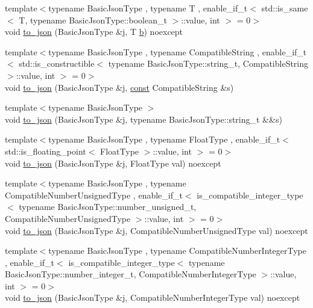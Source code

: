 \begin{DoxyCompactItemize}
\item 
{\footnotesize template$<$typename Basic\+Json\+Type , typename T , enable\+\_\+if\+\_\+t$<$ std\+::is\+\_\+same$<$ T, typename Basic\+Json\+Type\+::boolean\+\_\+t $>$\+::value, int $>$  = 0$>$ }\\void \hyperlink{namespacenlohmann_1_1detail_a1a804b98cbe89b7e44b698f2ca860490}{to\+\_\+json} (Basic\+Json\+Type \&j, T \hyperlink{jquery_8js_a2fa551895933fae935a0a6b87282241d}{b}) noexcept
\item 
{\footnotesize template$<$typename Basic\+Json\+Type , typename Compatible\+String , enable\+\_\+if\+\_\+t$<$ std\+::is\+\_\+constructible$<$ typename Basic\+Json\+Type\+::string\+\_\+t, Compatible\+String $>$\+::value, int $>$  = 0$>$ }\\void \hyperlink{namespacenlohmann_1_1detail_a7356ed05cdbbb080cee80e1211e1c6c9}{to\+\_\+json} (Basic\+Json\+Type \&j, \hyperlink{functions__c_8js_afacfd9c985d225bb07483b887a801b6f}{const} Compatible\+String \&s)
\item 
{\footnotesize template$<$typename Basic\+Json\+Type $>$ }\\void \hyperlink{namespacenlohmann_1_1detail_a4aa1ca6b7c61bf19d1f30ea5b669f68e}{to\+\_\+json} (Basic\+Json\+Type \&j, typename Basic\+Json\+Type\+::string\+\_\+t \&\&s)
\item 
{\footnotesize template$<$typename Basic\+Json\+Type , typename Float\+Type , enable\+\_\+if\+\_\+t$<$ std\+::is\+\_\+floating\+\_\+point$<$ Float\+Type $>$\+::value, int $>$  = 0$>$ }\\void \hyperlink{namespacenlohmann_1_1detail_a22bffdc8bc7e43af380ba2050696b230}{to\+\_\+json} (Basic\+Json\+Type \&j, Float\+Type val) noexcept
\item 
{\footnotesize template$<$typename Basic\+Json\+Type , typename Compatible\+Number\+Unsigned\+Type , enable\+\_\+if\+\_\+t$<$ is\+\_\+compatible\+\_\+integer\+\_\+type$<$ typename Basic\+Json\+Type\+::number\+\_\+unsigned\+\_\+t, Compatible\+Number\+Unsigned\+Type $>$\+::value, int $>$  = 0$>$ }\\void \hyperlink{namespacenlohmann_1_1detail_ae5fd66b5517b3b5a6c6b9fd9f29ba8dc}{to\+\_\+json} (Basic\+Json\+Type \&j, Compatible\+Number\+Unsigned\+Type val) noexcept
\item 
{\footnotesize template$<$typename Basic\+Json\+Type , typename Compatible\+Number\+Integer\+Type , enable\+\_\+if\+\_\+t$<$ is\+\_\+compatible\+\_\+integer\+\_\+type$<$ typename Basic\+Json\+Type\+::number\+\_\+integer\+\_\+t, Compatible\+Number\+Integer\+Type $>$\+::value, int $>$  = 0$>$ }\\void \hyperlink{namespacenlohmann_1_1detail_a91fe576be579c8c2fdd14610605c6dd2}{to\+\_\+json} (Basic\+Json\+Type \&j, Compatible\+Number\+Integer\+Type val) noexcept

\end{DoxyCompactItemize}
